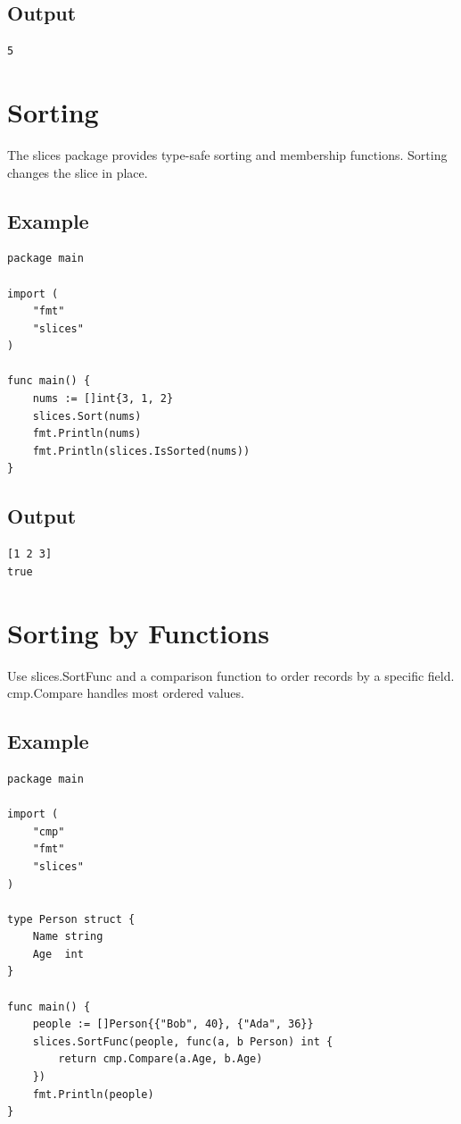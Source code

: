 \documentclass[10pt,oneside]{article}
\newcommand{\sectionline}{\par\vspace{4pt}{\color{rule}\hrule height .5pt}\vspace{7pt}\color{ink}\noindent}
\begin{document}
\subsection*{Output}
\begin{lstlisting}[style=terminal]
5
\end{lstlisting}
\clearpage
\section{Sorting}
\sectionline
The slices package provides type-safe sorting and membership functions. Sorting changes the slice in place.\par
\subsection*{Example}
\begin{lstlisting}[style=gocode]
package main

import (
	"fmt"
	"slices"
)

func main() {
	nums := []int{3, 1, 2}
	slices.Sort(nums)
	fmt.Println(nums)
	fmt.Println(slices.IsSorted(nums))
}
\end{lstlisting}
\subsection*{Output}
\begin{lstlisting}[style=terminal]
[1 2 3]
true
\end{lstlisting}
\clearpage
\section{Sorting by Functions}
\sectionline
Use slices.SortFunc and a comparison function to order records by a specific field. cmp.Compare handles most ordered values.\par
\subsection*{Example}
\begin{lstlisting}[style=gocode]
package main

import (
	"cmp"
	"fmt"
	"slices"
)

type Person struct {
	Name string
	Age  int
}

func main() {
	people := []Person{{"Bob", 40}, {"Ada", 36}}
	slices.SortFunc(people, func(a, b Person) int {
		return cmp.Compare(a.Age, b.Age)
	})
	fmt.Println(people)
}
\end{lstlisting}
\end{document}
